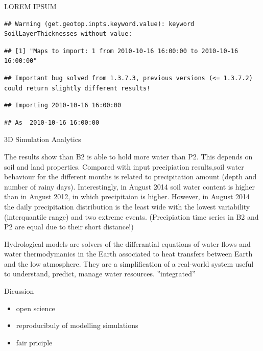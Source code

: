 \documentclass[ignorenonframetext,]{beamer}
\providecommand{\tightlist}{%
  \setlength{\itemsep}{0pt}\setlength{\parskip}{0pt}}
\begin{document}
\begin{frame}[fragile]{LOREM IPSUM}

\begin{verbatim}
## Warning (get.geotop.inpts.keyword.value): keyword SoilLayerThicknesses without value:
\end{verbatim}

\begin{verbatim}
## [1] "Maps to import: 1 from 2010-10-16 16:00:00 to 2010-10-16 16:00:00"
\end{verbatim}

\begin{verbatim}
## Important bug solved from 1.3.7.3, previous versions (<= 1.3.7.2) could return slightly different results!
\end{verbatim}

\begin{verbatim}
## Importing 2010-10-16 16:00:00
\end{verbatim}

\begin{verbatim}
## As  2010-10-16 16:00:00
\end{verbatim}

\end{frame}

\begin{frame}{3D Simulation Analytics}

The results show than B2 is able to hold more water than P2. This
depends on soil and land properties. Compared with input precipiation
results,soil water behaviour for the different months is related to
precipitation amount (depth and number of rainy days). Interestingly, in
August 2014 soil water content is higher than in August 2012, in which
precipitaion is higher. However, in August 2014 the daily precipitation
distribution is the least wide with the lowest variability
(interquantile range) and two extreme events. (Precipiation time series
in B2 and P2 are equal due to their short distance!)

Hydrological models are solvers of the differantial equations of water
flows and water thermodymanics in the Earth associated to heat transfers
between Earth and the low atmosphere. They are a simplification of a
real-world system useful to understand, predict, manage water resources.
''integrated''

\end{frame}

\begin{frame}{Dicussion}

\begin{itemize}
\tightlist
\item
  open science
\item
  reproducibuly of modelling simulations
\item
  fair priciple
\end{itemize}

\end{frame}
\end{document}
